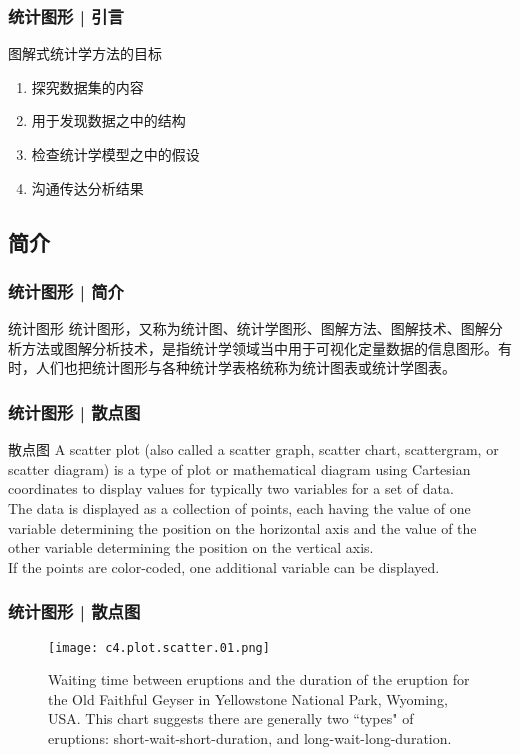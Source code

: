 \begin{frame}
  \frametitle{统计图形 | 引言}
  \begin{block}{图解式统计学方法的目标}
    \begin{enumerate}
      \item 探究数据集的内容
      \item 用于发现数据之中的结构
      \item 检查统计学模型之中的假设
      \item 沟通传达分析结果
    \end{enumerate}
  \end{block}
\end{frame}

\subsection{简介}
\begin{frame}
  \frametitle{统计图形 | 简介}
  \begin{block}{统计图形}
统计图形，又称为统计图、统计学图形、图解方法、图解技术、图解分析方法或图解分析技术，是指统计学领域当中用于可视化定量数据的信息图形。有时，人们也把统计图形与各种统计学表格统称为统计图表或统计学图表。
  \end{block}
\end{frame}

\begin{frame}
  \frametitle{统计图形 | 散点图}
  \begin{block}{散点图}
    A scatter plot (also called a scatter graph, scatter chart, scattergram, or scatter diagram) is a type of plot or mathematical diagram using Cartesian coordinates to display values for typically two variables for a set of data.\\
    \vspace{0.5em}
    The data is displayed as a collection of points, each having the value of one variable determining the position on the horizontal axis and the value of the other variable determining the position on the vertical axis.\\
    \vspace{0.5em}
    If the points are color-coded, one additional variable can be displayed.
  \end{block}
\end{frame}

\begin{frame}
  \frametitle{统计图形 | 散点图}
  \begin{figure}
    \centering
    \texttt{[image: c4.plot.scatter.01.png]}
    \caption{Waiting time between eruptions and the duration of the eruption for the Old Faithful Geyser in Yellowstone National Park, Wyoming, USA. This chart suggests there are generally two ``types" of eruptions: short-wait-short-duration, and long-wait-long-duration.}
  \end{figure}
\end{frame}

